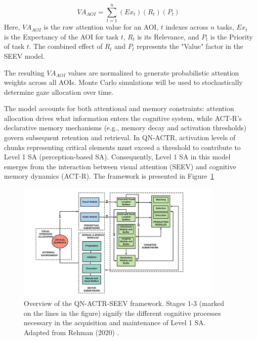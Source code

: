 \documentclass[12pt,a4paper]{article} %
\begin{document}
	\begin{equation}
		VA_{AOI} = \sum_{t=1}^{n} (Ex_t) (R_t) (P_t)
		\label{eq:VA_AOI}
	\end{equation}
	Here, $VA_{AOI}$ is the raw attention value for an AOI, $t$ indexes across $n$ tasks, $Ex_t$ is the Expectancy of the AOI for task $t$, $R_t$ is its Relevance, and $P_t$ is the Priority of task $t$. The combined effect of $R_t$ and $P_t$ represents the "Value" factor in the SEEV model.
	
	The resulting $VA_{AOI}$ values are normalized to generate probabilistic attention weights across all AOIs. Monte Carlo simulations will be used to stochastically determine gaze allocation over time.
	
	The model accounts for both attentional and memory constraints: attention allocation drives what information enters the cognitive system, while ACT-R's declarative memory mechanisms (e.g., memory decay and activation thresholds) govern subsequent retention and retrieval. In QN-ACTR, activation levels of chunks representing critical elements must exceed a threshold to contribute to Level 1 SA (perception-based SA). Consequently, Level 1 SA in this model emerges from the interaction between visual attention (SEEV) and cognitive memory dynamics (ACT-R). The framework is presented in Figure~\ref{fig:qn-actr-seev}

	\begin{figure}[H]
    \centering
    \includegraphics[width=0.9\textwidth]{./images/qn-actr-sa-synoptic.png}
    \caption{Overview of the QN-ACTR-SEEV framework. Stages 1-3 (marked on the lines in the figure) signify the different cognitive processes necessary in the acquisition and maintenance of Level 1 SA. Adapted from Rehman (2020) \parencite{rehman_phd_thesis}.}
    \label{fig:qn-actr-seev}
	\end{figure}
\end{document}
